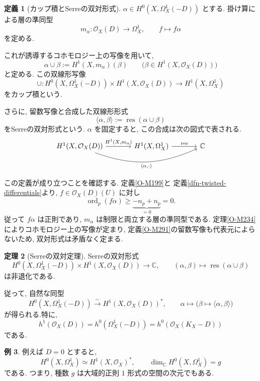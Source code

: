 \documentclass[dvipdfmx,a4paper,11pt]{article} %
\newcommand{\C}{\mathbb{C}}
\theoremstyle{definition}
\newtheorem{thm}{定理}[section]
\numberwithin{equation}{section}
\newtheorem{dfn}[thm]{定義}
\newtheorem{exa}[thm]{例}
\begin{document}
\begin{dfn}[カップ積とSerreの双対形式]

$\alpha\in H^0(X,\Omega_X^1(-D))$ とする.
掛け算による層の準同型
\[
m_\alpha:\mathcal O_X(D)\longrightarrow\Omega_X^1,
\qquad f\longmapsto f\alpha
\]
を定める.

これが誘導するコホモロジー上の写像を用いて, 
\[
\alpha\cup\beta
:=H^1(X,m_\alpha)(\beta)
\qquad
\bigl(\beta\in H^1(X,\mathcal O_X(D))\bigr)
\]
と定める.
この双線形写像
\[
\cup:
H^0(X,\Omega_X^1(-D))
\times H^1(X,\mathcal O_X(D))
\longrightarrow H^1(X,\Omega_X^1)
\]
をカップ積という.

さらに, 留数写像と合成した双線形形式
\[
\langle\alpha,\beta\rangle
:=\operatorname{res}(\alpha\cup\beta)
\]
をSerreの双対形式という.
$\alpha$ を固定すると, この合成は次の図式で表される.
\[
\begin{tikzcd}[column sep=large]
H^1(X,\mathcal O_X(D))\arrow[r,"{H^1(X,m_\alpha)}"]\arrow[rr,bend right=22,"{\langle\alpha,\cdot\rangle}"']
&H^1(X,\Omega_X^1)\arrow[r,"\operatorname{res}"]&\C
\end{tikzcd}
\]

\end{dfn}
この定義が成り立つことを確認する. 定義\ref{O-M199}と
定義\ref{dfn-twisted-differentials}より, $f\in\mathcal O_X(D)(U)$ に対し
\[
\operatorname{ord}_p(f\alpha)\geq\underbrace{-n_p+n_p}_{=0}=0.
\]
従って $f\alpha$ は正則であり, $m_\alpha$ は制限と両立する層の準同型である.
定理\ref{O-M234}によりコホモロジー上の写像が定まり,
定義\ref{O-M291}の留数写像も代表元によらないため, 双対形式は矛盾なく定まる.


\begin{thm}[Serreの双対定理]\label{O-M292}
Serreの双対形式
\[
H^0(X,\Omega_X^1(-D))
\times H^1(X,\mathcal O_X(D))
\longrightarrow\C,
\qquad
(\alpha,\beta)\longmapsto
\operatorname{res}(\alpha\cup\beta)
\]
は非退化である.

従って, 自然な同型
\[
H^0(X,\Omega_X^1(-D))
\xrightarrow{\sim}H^1(X,\mathcal O_X(D))^*,
\qquad
\alpha\longmapsto
\bigl(\beta\mapsto\langle\alpha,\beta\rangle\bigr)
\]
が得られる.特に, 
\[
h^1(\mathcal O_X(D))
=h^0(\Omega_X^1(-D))
=h^0(\mathcal O_X(K_X-D))
\]
である.
\end{thm}


\begin{exa}

例えば $D=0$ とすると, 
\[
H^0(X,\Omega_X^1)\simeq H^1(X,\mathcal O_X)^*,
\qquad
\dim_{\C}H^0(X,\Omega_X^1)=g
\]
である.
つまり, 種数 $g$ は大域的正則 $1$ 形式の空間の次元でもある.
\end{exa}
\end{document}

